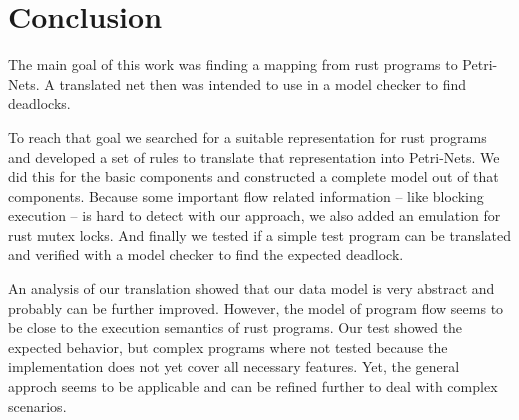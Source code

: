 \chapter{Conclusion}
\label{conclusion}
The main goal of this work was finding a mapping from rust programs to Petri-Nets.
A translated net then was intended to use in a model checker to find deadlocks.

To reach that goal we searched for a suitable representation for rust programs and developed a set of rules to translate that representation into Petri-Nets.
We did this for the basic components and constructed a complete model out of that components.
Because some important flow related information -- like blocking execution -- is hard to detect with our approach, we also added an emulation for rust mutex locks.
And finally we tested if a simple test program can be translated and verified with a model checker to find the expected deadlock.

An analysis of our translation showed that our data model is very abstract and probably can be further improved.
However, the model of program flow seems to be close to the execution semantics of rust programs.
Our test showed the expected behavior, but complex programs where not tested because the implementation does not yet cover all necessary features.
Yet, the general approch seems to be applicable and can be refined further to deal with complex scenarios.
